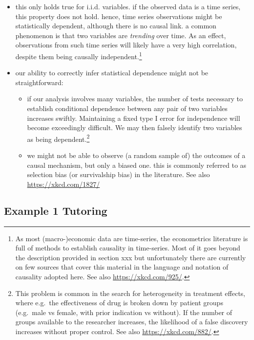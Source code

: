 \documentclass[
]{book}
\providecommand{\tightlist}{%
  \setlength{\itemsep}{0pt}\setlength{\parskip}{0pt}}
\theoremstyle{definition}
\theoremstyle{definition}
\theoremstyle{definition}
\theoremstyle{remark}
\begin{document}
\begin{itemize}
\item
  this only holds true for i.i.d. variables. if the observed data is a time series, this property does not hold. hence, time series observations might be statistically dependent, although there is no causal link. a common phenomenon is that two variables are \emph{trending} over time. As an effect, observations from such time series will likely have a very high correlation, despite them being causally independent.\footnote{As most (macro-)economic data are time-series, the econometrics literature is full of methods to establish causality in time-series. Most of it goes beyond the description provided in section xxx but unfortunately there are currently on few sources that cover this material in the language and notation of causality adopted here. See also \url{https://xkcd.com/925/}.}
\item
  our ability to correctly infer statistical dependence might not be straightforward:

  \begin{itemize}
  \tightlist
  \item
    if our analysis involves many variables, the number of tests necessary to establish conditional dependence between any pair of two variables increases swiftly. Maintaining a fixed type I error for independence will become exceedingly difficult. We may then falsely identify two variables as being dependent.\footnote{This problem is common in the search for heterogeneity in treatment effects, where e.g.~the effectiveness of drug is broken down by patient groups (e.g.~male vs female, with prior indication vs without). If the number of groups available to the researcher increases, the likelihood of a false discovery increases without proper control. See also \url{https://xkcd.com/882/}.}
  \item
    we might not be able to observe (a random sample of) the outcomes of a causal mechanism, but only a biased one. this is commonly referred to as selection bias (or survivalship bias) in the literature. See also \url{https://xkcd.com/1827/}
  \end{itemize}
\end{itemize}

\hypertarget{example-1-tutoring}{%
\subsection{Example 1 Tutoring}\label{example-1-tutoring}}
\end{document}
